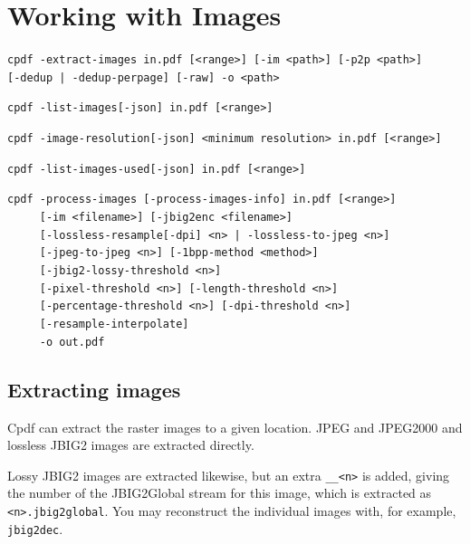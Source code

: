 \documentclass{book}
\begin{document}
\chapter{Working with Images}\label{chap:13}
\begin{framed}
\noindent\small\verb!cpdf -extract-images in.pdf [<range>] [-im <path>] [-p2p <path>]!
\noindent\small\verb!     [-dedup | -dedup-perpage] [-raw] -o <path>!

\vspace{1.5mm}
\noindent\small\verb!cpdf -list-images[-json] in.pdf [<range>]!

\vspace{1.5mm}
\noindent\small\verb!cpdf -image-resolution[-json] <minimum resolution> in.pdf [<range>]!

\vspace{1.5mm}
\noindent\small\verb!cpdf -list-images-used[-json] in.pdf [<range>]!

\vspace{1.5mm}
\noindent\small\verb!cpdf -process-images [-process-images-info] in.pdf [<range>]!\\
\noindent\small\verb!     [-im <filename>] [-jbig2enc <filename>]!\\
\noindent\small\verb!     [-lossless-resample[-dpi] <n> | -lossless-to-jpeg <n>]!\\
\noindent\small\verb!     [-jpeg-to-jpeg <n>] [-1bpp-method <method>]!\\
\noindent\small\verb!     [-jbig2-lossy-threshold <n>]!\\
\noindent\small\verb!     [-pixel-threshold <n>] [-length-threshold <n>]!\\
\noindent\small\verb!     [-percentage-threshold <n>] [-dpi-threshold <n>]!\\
\noindent\small\verb!     [-resample-interpolate]!\\
\noindent\small\verb!     -o out.pdf!


\end{framed}

\section{Extracting images}

Cpdf can extract the raster images to a given location. JPEG and JPEG2000 and lossless JBIG2 images are extracted directly.

Lossy JBIG2 images are extracted likewise, but an extra \texttt{\_\_<n>} is added, giving the number of the JBIG2Global stream for this image, which is extracted as \texttt{<n>.jbig2global}. You may reconstruct the individual images with, for example, \texttt{jbig2dec}.
\end{document}
